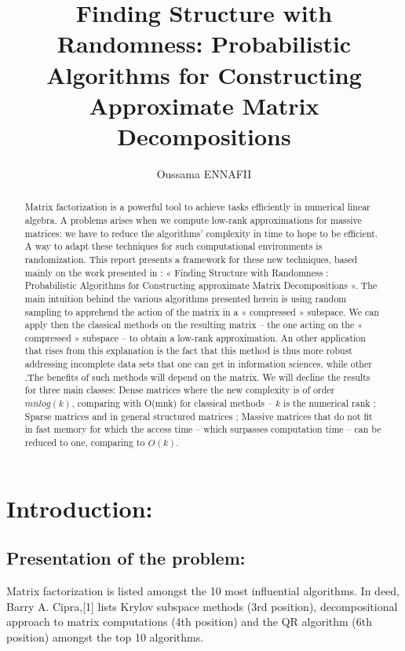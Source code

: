 \documentclass[onecolumn,11pt]{article}
\author{Oussama ENNAFII}
\title{Finding Structure with Randomness: Probabilistic Algorithms for
Constructing Approximate Matrix Decompositions}
\begin{document}
\maketitle

\begin{abstract}
Matrix factorization is a powerful tool to achieve tasks efficiently in numerical linear algebra. A problems arises when we compute low-rank approximations for massive matrices: we have to reduce the algorithms’ complexity in time to hope to be efficient. A way to adapt these techniques for such computational environments is randomization. This report presents a framework for these new techniques, based mainly on the work presented in : « Finding Structure with Randomness : Probabilistic Algorithms for Constructing approximate Matrix Decompositions ». The main intuition behind the various algorithms presented herein is using random sampling to apprehend the action of the matrix in a « compressed » subspace. We can apply then the classical methods on the resulting matrix – the one acting on the « compressed » subspace – to obtain a low-rank approximation. An other application that rises from this explanation is the fact that this method is thus more robust addressing incomplete data sets that one can get in information sciences, while other .The benefits of such methods will depend on the matrix. We will decline the results for three main classes: Dense matrices where the new complexity is of order $mnlog(k)$, comparing with O(mnk) for classical methods – $k$ is the numerical rank ; Sparse matrices and in general structured matrices ; Massive matrices that do not fit in fast memory for which the access time – which surpasses computation time – can be reduced to one, comparing to $O(k)$.
\end{abstract}
\newpage
\tableofcontents
\newpage
\section{Introduction:}
\subsection{Presentation of the problem:}

Matrix factorization is listed amongst the 10 most influential algorithms. In deed, Barry A. Cipra,[1] lists Krylov subspace methods (3rd position), decompositional approach to matrix computations (4th position) and the QR algorithm (6th position) amongst the top 10 algorithms. \\
\end{document}
